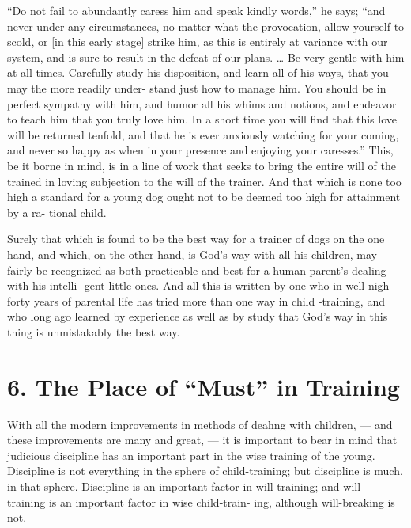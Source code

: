 \documentclass[
]{book}
\begin{document}
``Do not fail to abundantly caress him and speak kindly words,'' he says; ``and never under any circumstances, no matter what the provocation, allow yourself to scold, or {[}in this early stage{]} strike him, as this is entirely at variance with our system, and is sure to result in the defeat of our plans. \ldots{} Be very gentle with him at all times. Carefully study his disposition, and learn all of his ways, that you may the more readily under- stand just how to manage him. You should be in perfect sympathy with him, and humor all his whims and notions, and endeavor to teach him that you truly love him. In a short time you will find that this love will be returned tenfold, and that he is ever anxiously watching for your coming, and never so happy as when in your presence and enjoying your caresses.'' This, be it borne in mind, is in a line of work that seeks to bring the entire will of the trained in loving subjection to the will of the trainer. And that which is none too high a standard for a young dog ought not to be deemed too high for attainment by a ra- tional child.

Surely that which is found to be the best way for a trainer of dogs on the one hand, and which, on the other hand, is God's way with all his children, may fairly be recognized as both practicable and best for a human parent's dealing with his intelli- gent little ones. And all this is written by one who in well-nigh forty years of parental life has tried more than one way in child -training, and who long ago learned by experience as well as by study that God's way in this thing is unmistakably the best way.

\hypertarget{the-place-of-must-in-training}{%
\chapter{6. The Place of ``Must'' in Training}\label{the-place-of-must-in-training}}

With all the modern improvements in methods of deahng with children, --- and these improvements are many and great, --- it is important to bear in mind that judicious discipline has an important part in the wise training of the young. Discipline is not everything in the sphere of child-training; but discipline is much, in that sphere. Discipline is an important factor in will-training; and will- training is an important factor in wise child-train- ing, although will-breaking is not.
\end{document}
